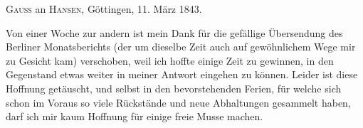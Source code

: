 \par{}\bigskip
\begin{center}
\textsc{Gauss} an \textsc{Hansen}, Göttingen, 11. März 1843.
\end{center}
\noindent\hspace*{\parindent}Von einer Woche zur andern ist mein Dank für die gefällige Übersendung des Berliner Monatsberichts (der um dieselbe Zeit auch auf gewöhnlichem Wege mir zu Gesicht kam) verschoben, weil ich hoffte einige Zeit zu gewinnen, in den Gegenstand etwas weiter in meiner Antwort eingehen zu können. Leider ist diese Hoffnung getäuscht, und selbst in den bevorstehenden Ferien, für welche sich schon im Voraus so viele Rückstände und neue Abhaltungen gesammelt haben, darf ich mir kaum Hoffnung für einige freie Musse machen.
